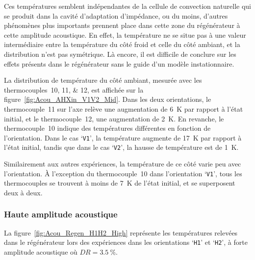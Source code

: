 Ces températures semblent indépendantes de la cellule de convection naturelle qui se produit dans la cavité d'adaptation d'impédance, ou du moins, d'autres phénomènes plus importants prennent place dans cette zone du régénérateur à cette amplitude acoustique. En effet, la température ne se situe pas à une valeur intermédiaire entre la température du côté froid et celle du côté ambiant, et la distribution n'est pas symétrique. Là encore, il est difficile de conclure sur les effets présents dans le régénérateur sans le guide d'un modèle instationnaire.\medskip

La distribution de température du côté ambiant, mesurée avec les thermocouples~\numlist{10;11;12}, est affichée sur la figure~\ref{fig:Acou_AHXin_V1V2_Mid}. Dans les deux orientations, le thermocouple~\num{11} sur l'axe relève une augmentation de \qty{6}{\kelvin} par rapport à l'état initial, et le thermocouple~\num{12}, une augmentation de \qty{2}{\kelvin}. En revanche, le thermocouple~\num{10} indique des températures différentes en fonction de l'orientation. Dans le cas `\texttt{V1}', la température augmente de \qty{17}{\kelvin} par rapport à l'état initial, tandis que dans le cas `\texttt{V2}', la hausse de température est de \qty{1}{\kelvin}. 

Similairement aux autres expériences, la température de ce côté varie peu avec l'orientation. À l'exception du thermocouple~\num{10} dans l'orientation `\texttt{V1}', tous les thermocouples se trouvent à moins de \qty{7}{\kelvin} de l'état initial, et se superposent deux à deux.\bigskip


\subsubsection{Haute amplitude acoustique}\label{chap:Acou_Regen_High}
La figure~\ref{fig:Acou_Regen_H1H2_High} représente les températures relevées dans le régénérateur lors des expériences dans les orientations `\texttt{H1}' et `\texttt{H2}', à forte amplitude acoustique où $DR=\qty{3.5}{\percent}$.\medskip

